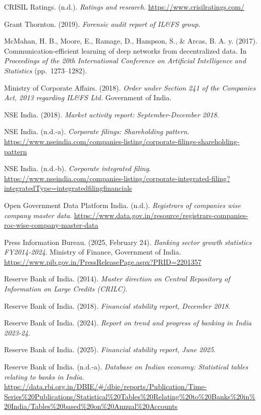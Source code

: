\documentclass[12pt]{article}
\newcommand{\aparef}[1]{\par\noindent\hangindent=0.5in\hangafter=1 #1\par}
\begin{document}
\aparef{CRISIL Ratings. (n.d.). \textit{Ratings and research}. \url{https://www.crisilratings.com/}}

\aparef{Grant Thornton. (2019). \textit{Forensic audit report of IL\&FS group}.}

\aparef{McMahan, H. B., Moore, E., Ramage, D., Hampson, S., \& Arcas, B. A. y. (2017). Communication-efficient learning of deep networks from decentralized data. In \textit{Proceedings of the 20th International Conference on Artificial Intelligence and Statistics} (pp.\ 1273--1282).}

\aparef{Ministry of Corporate Affairs. (2018). \textit{Order under Section 241 of the Companies Act, 2013 regarding IL\&FS Ltd.} Government of India.}

\aparef{NSE India. (2018). \textit{Market activity report: September-December 2018}.}

\aparef{NSE India. (n.d.-a). \textit{Corporate filings: Shareholding pattern}. \url{https://www.nseindia.com/companies-listing/corporate-filings-shareholding-pattern}}

\aparef{NSE India. (n.d.-b). \textit{Corporate integrated filing}. \url{https://www.nseindia.com/companies-listing/corporate-integrated-filing?integratedType=integratedfilingfinancials}}

\aparef{Open Government Data Platform India. (n.d.). \textit{Registrars of companies wise company master data}. \url{https://www.data.gov.in/resource/registrars-companies-roc-wise-company-master-data}}

\aparef{Press Information Bureau. (2025, February 24). \textit{Banking sector growth statistics FY2014-2024}. Ministry of Finance, Government of India. \url{https://www.pib.gov.in/PressReleasePage.aspx?PRID=2201357}}

\aparef{Reserve Bank of India. (2014). \textit{Master direction on Central Repository of Information on Large Credits (CRILC)}.}

\aparef{Reserve Bank of India. (2018). \textit{Financial stability report, December 2018}.}

\aparef{Reserve Bank of India. (2024). \textit{Report on trend and progress of banking in India 2023-24}.}

\aparef{Reserve Bank of India. (2025). \textit{Financial stability report, June 2025}.}

\aparef{Reserve Bank of India. (n.d.-a). \textit{Database on Indian economy: Statistical tables relating to banks in India}. \url{https://data.rbi.org.in/DBIE/\#/dbie/reports/Publication/Time-Series\%20Publications/Statistical\%20Tables\%20Relating\%20to\%20Banks\%20in\%20India/Tables\%20based\%20on\%20Annual\%20Accounts}}
\end{document}
